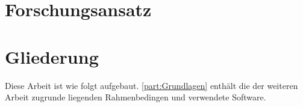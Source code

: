\section{Forschungsansatz}
\label{sec:intro-Forschungsansatz}

\section{Gliederung}
\label{sec:intro-Gliederung}

Diese Arbeit ist wie folgt aufgebaut. \cref{part:Grundlagen} enthält die der weiteren Arbeit zugrunde liegenden Rahmenbedingen und verwendete Software.


%
